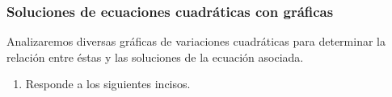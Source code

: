 \documentclass[11pt]{book}
\begin{document}
\begin{boxK}
\begin{enumerate}
    \end{enumerate}
\end{boxK}

\newpage

\subsubsection{Soluciones de ecuaciones cuadráticas con gráficas}

Analizaremos diversas gráficas de variaciones cuadráticas para determinar
la relación entre éstas y las soluciones de la ecuación asociada.

\begin{enumerate}
    \item Responde a los siguientes incisos.
          \begin{enumerate}


\end{enumerate}
\end{enumerate}
\end{document}
